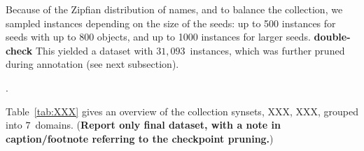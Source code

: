 

Because of the Zipfian distribution of names, and to balance the collection, we sampled instances depending on the size of the seeds: up to 500 instances for seeds with up to 800 objects, and up to 1000 instances for larger seeds. \textbf{double-check}
This yielded a dataset with $31,093$~instances, which was further pruned during annotation (see next subsection).

.

Table~\ref{tab:XXX} gives an overview of the collection synsets, XXX, XXX, grouped into $7$~domains. (\textbf{Report only final dataset, with a note in caption/footnote referring to the checkpoint pruning.})

